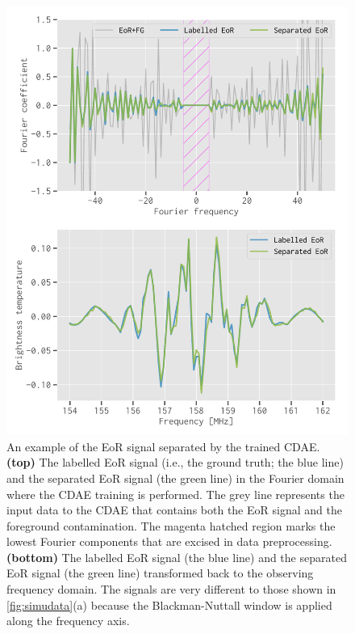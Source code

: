 \documentclass[letters,a4paper,fleqn,usenatbib]{mnras}
\begin{document}
\begin{figure}
  \centering
  \includegraphics[width=\columnwidth]{eor-result}
  \caption{\label{fig:result}%
    An example of the EoR signal separated by the trained CDAE.
    \textbf{(top)} The labelled EoR signal (i.e., the ground truth;
    the blue line) and the separated EoR signal (the green line) in the
    Fourier domain where the CDAE training is performed.
    The grey line represents the input data to the CDAE that contains
    both the EoR signal and the foreground contamination.
    The magenta hatched region marks the lowest Fourier components that
    are excised in data preprocessing.
    \textbf{(bottom)} The labelled EoR signal (the blue line) and the
    separated EoR signal (the green line) transformed back to the
    observing frequency domain.
    The signals are very different to those shown in
    \autoref{fig:simudata}(a) because the Blackman-Nuttall window is
    applied along the frequency axis.
  }
\end{figure}


\end{document}
